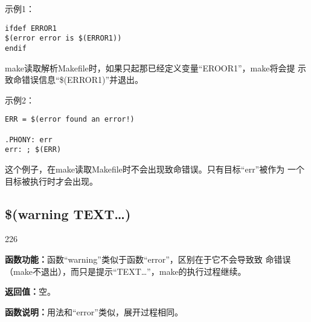 示例1：
\begin{Verbatim}[]
ifdef ERROR1
$(error error is $(ERROR1))
endif
\end{Verbatim}

\noindent make读取解析Makefile时，如果只起那已经定义变量“EROOR1”，make将会提
示致命错误信息“\$(ERROR1)”并退出。

示例2：
\begin{Verbatim}[]
ERR = $(error found an error!)

.PHONY: err
err: ; $(ERR)
\end{Verbatim}

\noindent 这个例子，在make读取Makefile时不会出现致命错误。只有目标“err”被作为
一个目标被执行时才会出现。

\subsection{\$(warning TEXT…)}
\begin{dinglist}{226}
\itemsep=4pt \parskip=0pt
\item \textbf{函数功能：}函数“warning”类似于函数“error”，区别在于它不会导致致
    命错误（make不退出），而只是提示“TEXT…”，make的执行过程继续。

\item \textbf{返回值：}空。

\item \textbf{函数说明：}用法和“error”类似，展开过程相同。
\end{dinglist}
